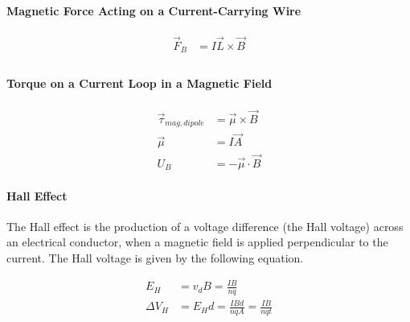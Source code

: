 \paragraph*{Magnetic Force Acting on a Current-Carrying Wire}

\begin{align*}
    \vec{F}_B &= I\vec{L} \times \vec{B}\\
\end{align*}

\paragraph*{Torque on a Current Loop in a Magnetic Field}

\begin{align*}
    \vec{\tau}_{mag,dipole} &= \vec{\mu} \times \vec{B}\\
    \vec{\mu} &= I\vec{A}\\
    U_B &= -\vec{\mu} \cdot \vec{B}
\end{align*}


\paragraph*{Hall Effect}
The Hall effect is the production of a voltage difference (the Hall voltage) across an electrical conductor,
when a magnetic field is applied perpendicular to the current. The Hall voltage is given by the following equation.

\begin{align*}
    E_H &= v_dB = \frac{IB}{nq}\\
    \Delta V_H &= E_H d = \frac{IBd}{nqA} = \frac{IB}{nqt}
\end{align*}